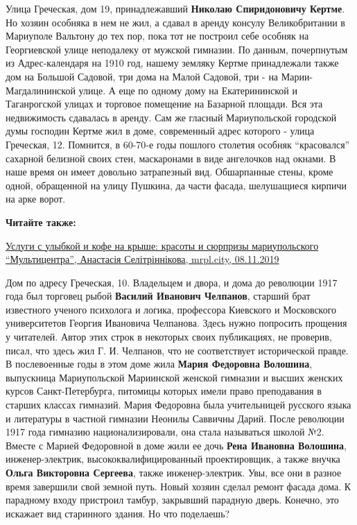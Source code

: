 
Улица Греческая, дом 19, принадлежавший \textbf{Николаю Спиридоновичу Кертме}.
Но хозяин особняка в нем не жил, а сдавал в аренду консулу Великобритании в
Мариуполе Вальтону до тех пор, пока тот не построил себе особняк на
Георгиевской улице неподалеку от мужской гимназии. По данным, почерпнутым из
Адрес-календаря на 1910 год, нашему земляку Кертме принадлежали также дом на
Большой Садовой, три дома на Малой Садовой, три - на Марии-Магдалининской
улице. А еще по одному дому на Екатерининской и Таганрогской улицах и торговое
помещение на Базарной площади. Вся эта недвижимость сдавалась в аренду. Сам же
гласный Мариупольской городской думы господин Кертме жил в доме, современный
адрес которого - улица Греческая, 12. Помнится, в 60-70-е годы пошлого столетия
особняк \enquote{красовался} сахарной белизной своих стен, маскаронами в виде
ангелочков над окнами. В наше время он имеет довольно затрапезный вид.
Обшарпанные стены, кроме одной, обращенной на улицу Пушкина, да части фасада,
шелушащиеся кирпичи на арке ворот.

\textbf{Читайте также:} 

\href{https://mrpl.city/news/view/uslugi-s-ulybkoj-i-kofe-na-kryshe-krasoty-i-syurprizy-mariupolskogo-multitsentra-foto-360-plusvideo}{%
Услуги с улыбкой и кофе на крыше: красоты и сюрпризы мариупольского \enquote{Мультицентра}, Анастасія Селітріннікова, mrpl.city, 08.11.2019}

Дом по адресу Греческая, 10. Владельцем и двора, и дома до революции 1917 года
был торговец рыбой \textbf{Василий Иванович Челпанов}, старший брат известного ученого
психолога и логика, профессора Киевского и Московского университетов Георгия
Ивановича Челпанова. Здесь нужно попросить прощения у читателей. Автор этих
строк в некоторых своих публикациях, не проверив, писал, что здесь жил Г. И.
Челпанов, что не соответствует исторической правде. В послевоенные годы в этом
доме жила \textbf{Мария Федоровна Волошина}, выпускница Мариупольской Мариинской женской
гимназии и высших женских курсов Санкт-Петербурга, питомицы которых имели право
преподавания в старших классах гимназий. Мария Федоровна была учительницей
русского языка и литературы в частной гимназии Неонилы Саввичны Дарий. После
революции 1917 года гимназию национализировали, она стала называться школой №2.
Вместе с Марией Федоровной в доме жили ее дочь \textbf{Рена Ивановна Волошина},
инженер-электрик, высококвалифицированный проектировщик, а также внучка \textbf{Ольга
Викторовна Сергеева}, также инженер-электрик. Увы, все они в разное время
завершили свой земной путь. Новый хозяин сделал ремонт фасада дома. К парадному
входу пристроил тамбур, закрывший парадную дверь. Конечно, это искажает вид
старинного здания. Но что поделаешь?

